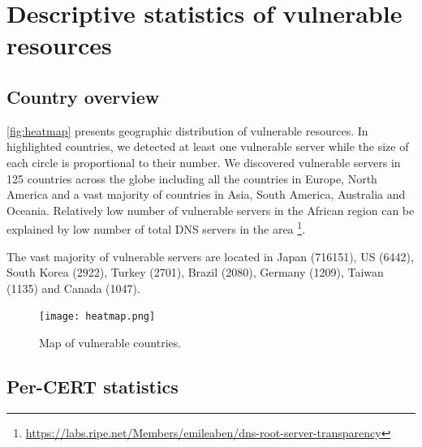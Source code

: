 \section{Descriptive statistics of vulnerable resources}
\subsection{Country overview}
\autoref{fig:heatmap} presents geographic distribution of vulnerable resources. In highlighted countries, we detected at least one vulnerable server while the size of each circle is proportional to their number. We discovered vulnerable servers in 125 countries across the globe including all the countries in Europe, North America and a vast majority of countries in Asia, South America, Australia and Oceania. Relatively low number of vulnerable servers in the African region can be explained by low number of total DNS servers in the area \footnote{\url{https://labs.ripe.net/Members/emileaben/dns-root-server-transparency}}. 

The vast majority of vulnerable servers are located in Japan (716151), US (6442), South Korea (2922), Turkey (2701), Brazil (2080), Germany (1209), Taiwan (1135) and Canada (1047). 


\begin{figure}[!hbt]
\centering
\texttt{[image: heatmap.png]}
\caption{Map of vulnerable countries.}
\label{fig:heatmap}
\end{figure}



\subsection{Per-CERT statistics}

